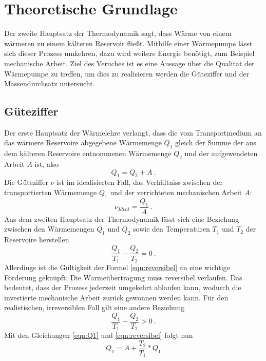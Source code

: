 \section{Theoretische Grundlage}
\label{sec:Theorie}

Der zweite Hauptsatz der Thermodynamik sagt, dass Wärme von einem wärmeren zu einem kälteren Reservoir fließt. Mithilfe einer Wärmepumpe lässt sich dieser Prozess umkehren, dazu wird weitere Energie benötigt, zum Beispiel mechanische Arbeit. Ziel des Veruches ist es eine Aussage über die Qualität der Wärmepumpe zu treffen, um dies zu realisieren werden die Güteziffer und der Massendurchsatz untersucht.

\subsection{Güteziffer}
Der erste Hauptsatz der Wärmelehre verlangt, dass die vom Transportmedium an das wärmere Reservoire abgegebene Wärmemenge $ Q_1 $ gleich der Summe der aus dem kälteren Reservoire entnommenen Wärmemenge $ Q_2 $ und der aufgewendeten Arbeit $ A $ ist, also
\begin{equation}
	\label{eqn:Q1}
		Q_1 = Q_2 + A \ .
\end{equation}
Die Güteziffer $ \nu $ ist im idealisierten Fall, das Verhältniss zwischen der transportierten Wärmemenge $ Q_1 $ und der verrichteten mechanischen Arbeit $ A $:
\begin{equation}
	\label{eqn:nu}
	\nu_{Ideal} = \frac{Q_1}{A} \ .
\end{equation}
Aus dem zweiten Hauptsatz der Thermodynamik lässt sich eine Beziehung zwischen den Wärmemengen $ Q_1 $ und $ Q_2 $ sowie den Temperaturen $ T_1 $ und $ T_2 $ der Reservoire herstellen
\begin{equation}
	\label{eqn:reversibel}
	\frac{Q_1}{T_1} - \frac{Q_2}{T_2} = 0 \ .
\end{equation}
Allerdings ist die Gültigkeit der Formel \ref{eqn:reversibel} an eine wichtige Forderung geknüpft: Die Wärmeübertragung muss reversibel verlaufen. Das bedeutet, dass der Prozess jederzeit umgekehrt ablaufen kann, wodurch die investierte mechanische Arbeit zurück gewonnen werden kann. Für den realistischen, irreversiblen Fall gilt eine andere Beziehung
\begin{equation}
	\label{eqn:irreversibel}
	\frac{Q_1}{T_1} - \frac{Q_2}{T_2} > 0 \ .
\end{equation}
Mit den Gleichungen \ref{eqn:Q1} und \ref{eqn:reversibel} folgt nun
\begin{equation}
	Q_1 = A + \frac{T_2}{T_1} * Q_1
\end{equation}
